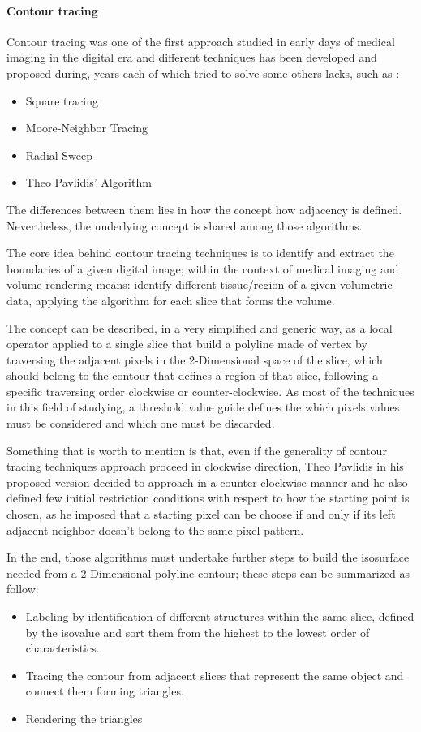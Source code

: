\documentclass[10pt,a4paper]{article}
\begin{document}
\paragraph{Contour tracing}
Contour tracing was one of the first approach studied in early days of medical imaging in the digital era and different techniques has been developed and proposed during, years each of which tried to solve some others lacks, such as :
\begin{itemize}
\item Square tracing
\item Moore-Neighbor Tracing
\item Radial Sweep
\item Theo Pavlidis' Algorithm 
\end{itemize}
The differences between them lies in how the concept how adjacency is defined.
Nevertheless, the underlying concept is shared among those algorithms.

The core idea behind contour tracing techniques is to identify and extract the boundaries of a given digital image; within the context of medical imaging and volume rendering means: identify different tissue/region of a given volumetric data, applying the algorithm for each slice that forms the volume. 

The concept can be described, in a very simplified and generic way, as a local operator %
applied to a single slice that build a polyline made of vertex by traversing the adjacent pixels in the 2-Dimensional space of the slice, which should belong to the contour that defines a region of that slice, following a specific traversing order clockwise or counter-clockwise. As most of the techniques in this field of studying, a threshold value guide defines the which pixels values must be considered and which one must be discarded.

Something that is worth to mention is that, even if the generality of contour tracing techniques approach proceed in clockwise direction, Theo Pavlidis in his proposed version decided to approach in a counter-clockwise manner and he also defined few initial restriction conditions with respect to how the starting point is chosen, as he imposed that a starting pixel can be choose if and only if its left adjacent neighbor doesn't belong to the same pixel pattern.

In the end, those algorithms must undertake further steps to build the isosurface needed from a 2-Dimensional polyline contour; these steps can be summarized as follow:
\begin{itemize}
\item Labeling by identification of different structures within the same slice, defined by the isovalue and sort them from the highest to the lowest order of characteristics.
\item Tracing the contour from adjacent slices that represent the same object and connect them forming triangles.
\item Rendering the triangles
\end{itemize}
\end{document}
